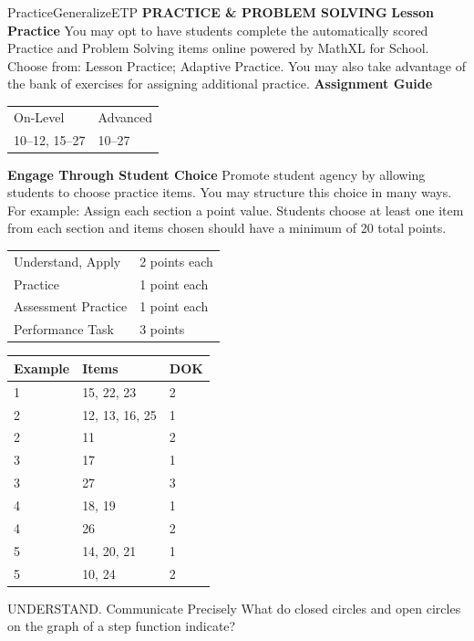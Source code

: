\documentclass{article}
\newenvironment{item-analysis}{}{}      %
\newenvironment{practice}[2]{}{}        %
\newenvironment{te-addendum}[2]{}{}     %
\newcommand{\answer}[1]{}               %
\newcommand{\te}[1]{}                   %
\begin{document}
\begin{te-addendum}{Practice}{GeneralizeETP}
\textbf{PRACTICE \& PROBLEM SOLVING}
\textbf{Lesson Practice} You may opt to have students complete the automatically scored Practice and Problem Solving items online powered by MathXL for School.
Choose from: Lesson Practice; Adaptive Practice.
You may also take advantage of the bank of exercises for assigning additional practice.
\textbf{Assignment Guide}
\begin{tabular}{ll}
On-Level & Advanced \\
10--12, 15--27 & 10--27 \\
\end{tabular}
\textbf{Engage Through Student Choice}
Promote student agency by allowing students to choose practice items. You may structure this choice in many ways.
For example:
Assign each section a point value. Students choose at least one item from each section and items chosen should have a minimum of 20 total points.
\begin{tabular}{ll}
Understand, Apply & 2 points each \\
Practice & 1 point each \\
Assessment Practice & 1 point each \\
Performance Task & 3 points \\
\end{tabular}
\te{Practice \& Problem Solving and video tutorials are available at SavvasRealize.com. Scan the QR code to access a video tutorial. Printed answers for Exercises 16--21 appear on PDF page 47 and are attached below.}
\end{te-addendum}
\begin{item-analysis}
\begin{tabular}{lll}
\toprule
Example & Items & DOK \\
\midrule
1 & 15, 22, 23 & 2 \\
2 & 12, 13, 16, 25 & 1 \\
2 & 11 & 2 \\
3 & 17 & 1 \\
3 & 27 & 3 \\
4 & 18, 19 & 1 \\
4 & 26 & 2 \\
5 & 14, 20, 21 & 1 \\
5 & 10, 24 & 2 \\
\bottomrule
\end{tabular}
\end{item-analysis}
\begin{practice}{10}{2}
UNDERSTAND. Communicate Precisely What do closed circles and open circles on the graph of a step function indicate?
\answer{Closed circles indicate that the values of a point are included in the domain and range of a function. Open circles indicate that the values are not included.}
\end{practice}
\end{document}
